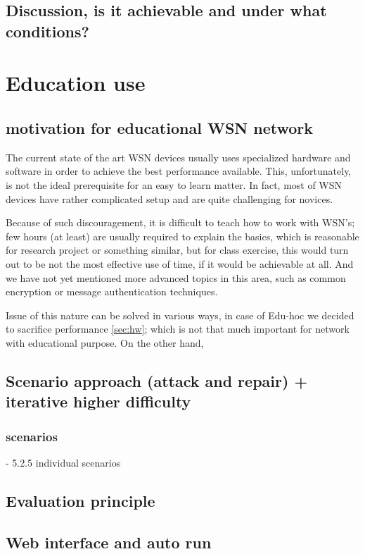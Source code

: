 \documentclass[
  digital, %
  table,   %
  nolof,     %
  nolot,     %
]{fithesis3}
\begin{document}
  \section{Discussion, is it achievable and under what conditions?}
\chapter{Education use}

  \section{motivation for educational WSN network}
  The current state of the art WSN devices usually uses specialized hardware
  and software in order to achieve the best performance available. This,
  unfortunately, is not the ideal prerequisite for an easy to learn matter.
  In fact, most of WSN devices have rather complicated setup and are
  quite challenging for novices.

  Because of such discouragement, it is difficult to teach how to
  work with WSN’s; few hours (at least) are usually required
  to explain the basics, which is reasonable for research project or
  something similar, but for class exercise, this would turn out to be
  not the most effective use of time, if it would be achievable at all. And
  we have not yet mentioned more advanced topics in this area, such as
  common encryption or message authentication techniques.

  Issue of this nature can be solved in various ways, %
  in case of Edu-hoc we decided to sacrifice performance \ref{sec:hw}; which is not that much important for network with educational purpose. On the other hand,
  \section{Scenario approach (attack and repair) + iterative higher difficulty}

    \subsection{scenarios} - 5.2.5 individual scenarios
  \section{Evaluation principle}
  \section{Web interface and auto run}
\end{document}
